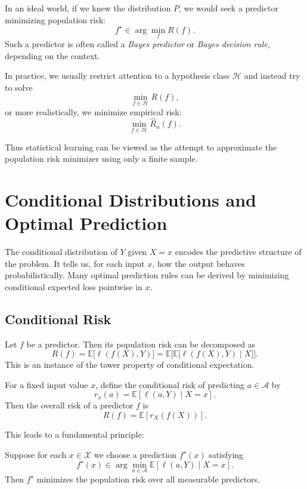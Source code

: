 In an ideal world, if we knew the distribution $P$, we would seek a predictor minimizing population risk:
\[
f^\star \in \arg\min_f R(f).
\]
Such a predictor is often called a \emph{Bayes predictor} or \emph{Bayes decision rule}, depending on the context.

In practice, we usually restrict attention to a hypothesis class $\mathcal{H}$ and instead try to solve
\[
\min_{f\in\mathcal{H}} R(f),
\]
or more realistically, we minimize empirical risk:
\[
\min_{f\in\mathcal{H}} \widehat{R}_n(f).
\]

Thus statistical learning can be viewed as the attempt to approximate the population risk minimizer using only a finite sample.

\section{Conditional Distributions and Optimal Prediction}

The conditional distribution of $Y$ given $X=x$ encodes the predictive structure of the problem. It tells us, for each input $x$, how the output behaves probabilistically. Many optimal prediction rules can be derived by minimizing conditional expected loss pointwise in $x$.

\subsection{Conditional Risk}

Let $f$ be a predictor. Then its population risk can be decomposed as
\[
R(f)=\mathbb{E}\big[\ell(f(X),Y)\big]
= \mathbb{E}\Big[\mathbb{E}\big[\ell(f(X),Y)\mid X\big]\Big].
\]
This is an instance of the tower property of conditional expectation.

For a fixed input value $x$, define the conditional risk of predicting $a\in\mathcal{A}$ by
\[
r_x(a) = \mathbb{E}[\ell(a,Y)\mid X=x].
\]
Then the overall risk of a predictor $f$ is
\[
R(f) = \mathbb{E}[r_X(f(X))].
\]

This leads to a fundamental principle:

\begin{proposition}
Suppose for each $x\in\mathcal{X}$ we choose a prediction $f^\star(x)$ satisfying
\[
f^\star(x)\in \arg\min_{a\in\mathcal{A}} \mathbb{E}[\ell(a,Y)\mid X=x].
\]
Then $f^\star$ minimizes the population risk over all measurable predictors.
\end{proposition}

